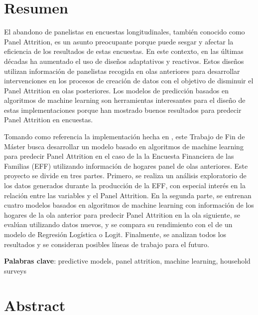 
\chapter*{Resumen}

\onehalfspacing

El abandono de panelistas en encuestas longitudinales, también conocido como Panel Attrition, es un asunto preocupante porque puede sesgar y afectar la eficiencia de los resultados de estas encuestas. En este contexto, en las últimas décadas ha aumentado el uso de diseños adaptativos y reactivos. Estos diseños utilizan información de panelistas recogida en olas anteriores para desarrollar intervenciones en los procesos de creación de datos con el objetivo de disminuir el Panel Attrition en olas posteriores. Los modelos de predicción basados en algoritmos de machine learning son herramientas interesantes para el diseño de estas implementaciones porque han mostrado buenos resultados para predecir Panel Attrition en encuestas.

Tomando como referencia la implementación hecha en \cite{beste2023case}, este Trabajo de Fin de Máster busca desarrollar un modelo basado en algoritmos de machine learning para predecir Panel Attrition en el caso de la la Encuesta Financiera de las Familias (EFF) utilizando información de hogares panel de olas anteriores. Este proyecto se divide en tres partes. Primero, se realiza un análisis exploratorio de los datos generados durante la producción de la EFF, con especial interés en la relación entre las variables y el Panel Attrition. En la segunda parte, se entrenan cuatro modelos basados en algoritmos de machine learning con información de los hogares de la ola anterior para predecir Panel Attrition en la ola siguiente, se evalúan utilizando datos nuevos, y se compara su rendimiento con el de un modelo de Regresión Logística o Logit. Finalmente, se analizan todos los resultados y se consideran posibles líneas de trabajo para el futuro.

\vspace{1.5cm}

\textbf{Palabras clave}: predictive models, panel attrition, machine learning, household surveys

\chapter*{Abstract}

